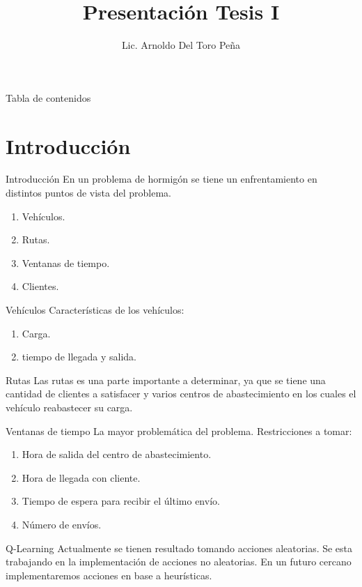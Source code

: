 \documentclass{beamer}
\title{Presentación Tesis I}
\author{Lic. Arnoldo Del Toro Peña }
\institute[UANL]{Universidad Autónoma de Nuevo León}
\newcommand{\ql}{Q-Learning}
\begin{document}
	
	\begin{frame}
		\titlepage
	\end{frame}
	
	\begin{frame}{Tabla de contenidos}
		\tableofcontents
	\end{frame}
	
	\section{Introducción}
	
	\begin{frame}{Introducción}
		En un problema de hormigón se tiene un enfrentamiento en distintos puntos de vista del problema.
		
		\begin{enumerate}
			\item Vehículos.
			\item Rutas.
			\item Ventanas de tiempo.
			\item Clientes.
		\end{enumerate}
	
	\end{frame} 
	
	\begin{frame}{Vehículos}
		Características de los vehículos:
		\begin{enumerate}
			\item Carga.
			\item tiempo de llegada y salida.
		\end{enumerate}
	\end{frame}

	\begin{frame}{Rutas}
		Las rutas es una parte importante a determinar, ya que se tiene una cantidad de clientes a satisfacer y varios centros de abastecimiento en los cuales el vehículo reabastecer su carga.
	\end{frame}
	
	\begin{frame}{Ventanas de tiempo}
		La mayor problemática del problema.
		Restricciones a tomar:
		\begin{enumerate}
			\item Hora de salida del centro de abastecimiento.
			\item Hora de llegada con cliente.
			\item Tiempo de espera para recibir el último envío.
			\item Número de envíos.
		\end{enumerate}
	\end{frame}
	
	\begin{frame}{\ql}
		Actualmente se tienen resultado tomando acciones aleatorias.
		\vspace{0.2 in}
		Se esta trabajando en la implementación de acciones no aleatorias.
				\vspace{0.2 in}
		En un futuro cercano implementaremos acciones en base a heurísticas.
	\end{frame}
		
	
	


	
\end{document}

